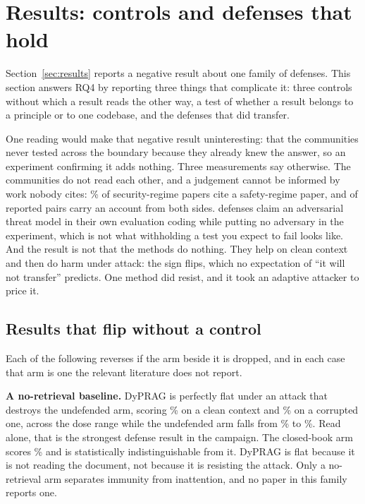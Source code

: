 \section{Results: controls and defenses that hold}
\label{sec:results2}

Section~\ref{sec:results} reports a negative result about one family of
defenses. This section answers RQ4 by reporting three things that
complicate it: three controls without
which a result reads the other way, a test of whether a result belongs to a
principle or to one codebase, and the defenses that did transfer.

One reading would make that negative result uninteresting: that the
communities never tested across the boundary because they already knew the
answer, so an experiment confirming it adds nothing. Three measurements say
otherwise. The communities do not read each other, and a judgement cannot be
informed by work nobody cites: \PctSecCitesSafety{}\% of security-regime
papers cite a safety-regime paper, and
\NOutcomeBothSides{} of \NOutcomePairs{} reported pairs carry an account
from both sides. \NDefClaimExceedsTest{} defenses claim an adversarial
threat model in their own evaluation coding while putting no adversary in
the experiment, which is not what withholding a test you expect to fail
looks like. And the result is not that the methods do nothing. They help on
clean context and then do harm under attack: the sign flips, which no
expectation of ``it will not transfer'' predicts. One method did resist, and
it took an adaptive attacker to price it.

\subsection{Results that flip without a control}

Each of the following reverses if the arm beside it is dropped, and in each
case that arm is one the relevant literature does not report.

\textbf{A no-retrieval baseline.} DyPRAG is perfectly
flat under an attack that destroys the undefended arm, scoring
\EDypragClean\% on a clean context and \EDypragSat\% on a corrupted one, across
the dose range while the undefended arm falls from \EDypragRagClean\% to
\EDypragRagSat\%. Read alone, that is the strongest defense result in the
campaign. The closed-book arm scores \EDypragNoRet\% and is statistically
indistinguishable from it.
DyPRAG is flat because it is not reading the document, not because it
is resisting the attack. Only a no-retrieval arm separates immunity from
inattention, and no paper in this family reports one.

